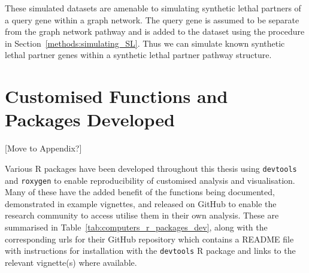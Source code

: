 These simulated datasets are amenable to simulating synthetic lethal partners of a query gene within a graph network. The query gene is assumed to be separate from the graph network pathway and is added to the dataset using the procedure in Section~\ref{methods:simulating_SL}. Thus we can simulate known synthetic lethal partner genes within a synthetic lethal partner pathway structure.

\iffalse

	\texttt{[image: \{"/home/tomkelly/Documents/PhD Otago Uni/SL\_Model/graph\_sim\_method/dist\_mat".png]}}
	\texttt{[image: \{"/home/tomkelly/Documents/PhD Otago Uni/SL\_Model/graph\_sim\_method/sigma\_mat".png]}}
		\texttt{[image: \{"/home/tomkelly/Documents/PhD Otago Uni/SL\_Model/graph\_sim\_method/expr\_mat".png]}}
			\texttt{[image: \{"/home/tomkelly/Documents/PhD Otago Uni/SL\_Model/graph\_sim\_method/expr\_cor\_mat".png]}}
		\texttt{[image: \{"/home/tomkelly/Documents/PhD Otago Uni/SL\_Model/graph\_sim\_method/expr\_disc\_mat".png]}}
		
	\texttt{[image: \{"/home/tomkelly/Documents/PhD Otago Uni/SL\_Model/graph\_sim\_method/state\_matrix\_inhibiting".png]}}
	\texttt{[image: \{"/home/tomkelly/Documents/PhD Otago Uni/SL\_Model/graph\_sim\_method/dist\_mat".png]}}
		\texttt{[image: \{"/home/tomkelly/Documents/PhD Otago Uni/SL\_Model/graph\_sim\_method/sigma\_mat\_inhibiting".png]}}
		\texttt{[image: \{"/home/tomkelly/Documents/PhD Otago Uni/SL\_Model/graph\_sim\_method/expr\_inhib\_mat".png]}}
			\texttt{[image: \{"/home/tomkelly/Documents/PhD Otago Uni/SL\_Model/graph\_sim\_method/expr\_inhib\_cor\_mat".png]}}
		\texttt{[image: \{"/home/tomkelly/Documents/PhD Otago Uni/SL\_Model/graph\_sim\_method/expr\_inhib\_disc\_mat".png]}}
	
\fi	

\FloatBarrier

\section{Customised Functions and Packages Developed} \label{methods:r_packages}

[Move to Appendix?]

Various R packages have been developed throughout this thesis using \texttt{devtools} \citep{devtools} and \texttt{roxygen} \citep{roxygen} to enable reproducibility of customised analysis and visualisation. Many of these have the added benefit of the functions being documented, demonstrated in example vignettes, and released on GitHub to enable the research community to access utilise them in their own analysis. These are summarised in Table~\ref{tab:computers_r_packages_dev}, along with the corresponding urls for their GitHub repository which contains a README file with instructions for installation with the \texttt{devtools} R package \citep{devtools} and links to the relevant vignette(s) where available.

